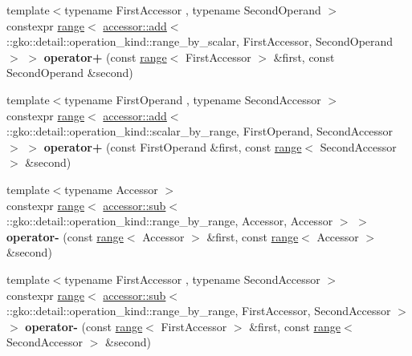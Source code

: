 \begin{DoxyCompactItemize}
\item 
\mbox{\label{namespacegko_add2193faa27b6fcc5c7220923141a3ad}} 
{\footnotesize template$<$typename First\+Accessor , typename Second\+Operand $>$ }\\constexpr \hyperlink{classgko_1_1range}{range}$<$ \hyperlink{structgko_1_1accessor_1_1add}{accessor\+::add}$<$ \+::gko\+::detail\+::operation\+\_\+kind\+::range\+\_\+by\+\_\+scalar, First\+Accessor, Second\+Operand $>$ $>$ {\bfseries operator+} (const \hyperlink{classgko_1_1range}{range}$<$ First\+Accessor $>$ \&first, const Second\+Operand \&second)
\item 
\mbox{\label{namespacegko_a15048e6bc74da6120729e407b5c74f30}} 
{\footnotesize template$<$typename First\+Operand , typename Second\+Accessor $>$ }\\constexpr \hyperlink{classgko_1_1range}{range}$<$ \hyperlink{structgko_1_1accessor_1_1add}{accessor\+::add}$<$ \+::gko\+::detail\+::operation\+\_\+kind\+::scalar\+\_\+by\+\_\+range, First\+Operand, Second\+Accessor $>$ $>$ {\bfseries operator+} (const First\+Operand \&first, const \hyperlink{classgko_1_1range}{range}$<$ Second\+Accessor $>$ \&second)
\item 
\mbox{\label{namespacegko_a4c773c140e30d751bbf8826c2faf4f74}} 
{\footnotesize template$<$typename Accessor $>$ }\\constexpr \hyperlink{classgko_1_1range}{range}$<$ \hyperlink{structgko_1_1accessor_1_1sub}{accessor\+::sub}$<$ \+::gko\+::detail\+::operation\+\_\+kind\+::range\+\_\+by\+\_\+range, Accessor, Accessor $>$ $>$ {\bfseries operator-\/} (const \hyperlink{classgko_1_1range}{range}$<$ Accessor $>$ \&first, const \hyperlink{classgko_1_1range}{range}$<$ Accessor $>$ \&second)
\item 
\mbox{\label{namespacegko_ae46f88660f5606ed9da1c156bb7139b6}} 
{\footnotesize template$<$typename First\+Accessor , typename Second\+Accessor $>$ }\\constexpr \hyperlink{classgko_1_1range}{range}$<$ \hyperlink{structgko_1_1accessor_1_1sub}{accessor\+::sub}$<$ \+::gko\+::detail\+::operation\+\_\+kind\+::range\+\_\+by\+\_\+range, First\+Accessor, Second\+Accessor $>$ $>$ {\bfseries operator-\/} (const \hyperlink{classgko_1_1range}{range}$<$ First\+Accessor $>$ \&first, const \hyperlink{classgko_1_1range}{range}$<$ Second\+Accessor $>$ \&second)

\end{DoxyCompactItemize}
